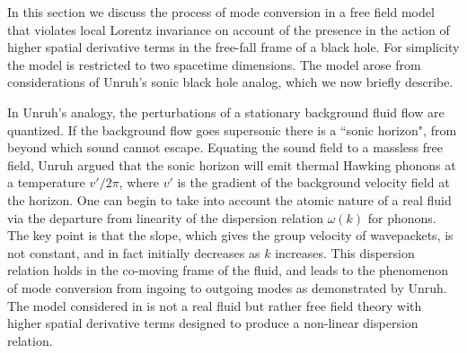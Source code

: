\documentclass[12pt]{article}
\begin{document}
In this section we discuss the process of mode conversion in a free
field model that violates local Lorentz invariance on account of the
presence in the action of higher spatial derivative terms in the
free-fall frame of a black hole. For simplicity the model is restricted
to two spacetime dimensions. The model arose from considerations of
Unruh's sonic black hole analog\cite{Unruh1}, which we now briefly
describe.

In Unruh's analogy, the perturbations of a stationary background fluid
flow are quantized. If the background flow goes supersonic there is a
``sonic horizon", from beyond which sound cannot escape. Equating the
sound field to a massless free field, Unruh argued that the sonic
horizon will emit thermal Hawking phonons at a temperature $v'/2\pi$,
where $v'$ is the gradient of the background velocity field at the
horizon. One can begin to take into account the atomic nature of a real
fluid via the departure from linearity of the dispersion relation
$\omega(k)$ for phonons\cite{Jaco1}.  The key point is that the slope,
which gives the group velocity of wavepackets, is not constant, and in
fact initially decreases as $k$ increases. This dispersion relation
holds in the co-moving frame of the fluid, and leads to the phenomenon
of mode conversion from ingoing to outgoing modes as demonstrated by
Unruh\cite{Unruh2}. The model considered in \cite{Unruh2} is not a real
fluid but rather free field theory with higher spatial derivative terms
designed to produce a non-linear dispersion relation.
\end{document}
